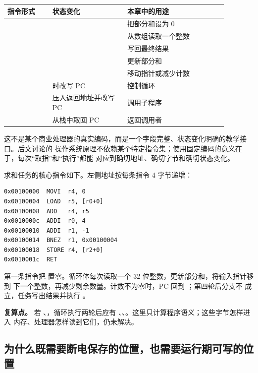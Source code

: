 \begin{longtable}{|L{0.18\linewidth}|L{0.30\linewidth}|L{0.40\linewidth}|}
\hline
{}
指令形式 & 状态变化 & 本章中的用途 \\ \hline
{} &  & 把部分和设为 0 \\ \hline
{} &  & 从数组读取一个整数 \\ \hline
{} &  & 写回最终结果 \\ \hline
{} &  & 更新部分和 \\ \hline
{} &  & 移动指针或减少计数 \\ \hline
{} &  时改写 PC & 控制循环 \\ \hline
{} & 压入返回地址并改写 PC & 调用子程序 \\ \hline
{} & 从栈中取回 PC & 返回调用者 \\ \hline
\end{longtable}

这不是某个商业处理器的真实编码，而是一个字段完整、状态变化明确的教学接口。后文讨论的
操作系统原理不依赖某个特定指令集；使用固定编码的意义在于，每次“取指”和“执行”都能
对应到确切地址、确切字节和确切状态变化。

求和任务的核心指令如下。左侧地址按每条指令 4 字节递增：

\begin{lstlisting}
0x00100000  MOVI  r4, 0
0x00100004  LOAD  r5, [r0+0]
0x00100008  ADD   r4, r5
0x0010000c  ADDI  r0, 4
0x00100010  ADDI  r1, -1
0x00100014  BNEZ  r1, 0x00100004
0x00100018  STORE r4, [r2+0]
0x0010001c  RET
\end{lstlisting}

第一条指令把  置零。循环体每次读取一个 32 位整数，更新部分和，将输入指针移到
下一个整数，再减少剩余数量。计数不为零时，PC 回到 ；第四轮后分支不
成立，任务写出结果并执行 。

\begin{problemframe}
\textbf{复算点。} 若 、，循环执行两轮后应有
、、。这里只计算程序语义；这些字节怎样进入
内存、处理器怎样读到它们，仍未解决。
\end{problemframe}

\subsection{为什么既需要断电保存的位置，也需要运行期可写的位置}

